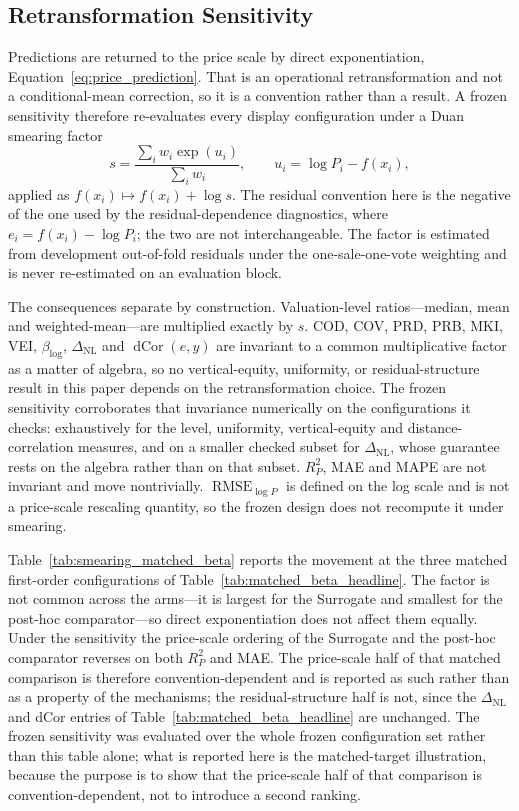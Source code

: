 \documentclass[10pt]{article}
\theoremstyle{definition}
\newcommand{\1}{\mathbf{1}}
\begin{document}
\subsection{Retransformation Sensitivity}
\label{app:smearing}

Predictions are returned to the price scale by direct exponentiation,
Equation~\eqref{eq:price_prediction}. That is an operational retransformation and not a
conditional-mean correction, so it is a convention rather than a result. A frozen sensitivity
therefore re-evaluates every display configuration under a Duan smearing factor
\[
s=\frac{\sum_i w_i\exp(u_i)}{\sum_i w_i},
\qquad u_i=\log P_i-f(x_i),
\]
applied as $f(x_i)\mapsto f(x_i)+\log s$. The residual convention here is the negative of the one
used by the residual-dependence diagnostics, where $e_i=f(x_i)-\log P_i$; the two are not
interchangeable. The factor is estimated from development out-of-fold residuals under the
one-sale-one-vote weighting and is never re-estimated on an evaluation block.

The consequences separate by construction. Valuation-level ratios---median, mean and
weighted-mean---are multiplied exactly by $s$. COD, COV, PRD, PRB, MKI, VEI, $\beta_{\log}$,
$\Delta_{\mathrm{NL}}$ and $\operatorname{dCor}(e,y)$ are invariant to a common multiplicative
factor as a matter of algebra, so no vertical-equity, uniformity, or residual-structure result in
this paper depends on the retransformation choice. The frozen sensitivity corroborates that
invariance numerically on the configurations it checks: exhaustively for the level, uniformity,
vertical-equity and distance-correlation measures, and on a smaller checked subset for
$\Delta_{\mathrm{NL}}$, whose guarantee rests on the algebra rather than on that subset.
$R^2_P$, MAE and MAPE are not invariant and move nontrivially.
$\operatorname{RMSE}_{\log P}$ is defined on the log scale and is not a price-scale rescaling
quantity, so the frozen design does not recompute it under smearing.

Table~\ref{tab:smearing_matched_beta} reports the movement at the three matched
first-order configurations of Table~\ref{tab:matched_beta_headline}. The factor is not common
across the arms---it is largest for the Surrogate and smallest for the post-hoc comparator---so
direct exponentiation does not affect them equally. Under the sensitivity the price-scale
ordering of the Surrogate and the post-hoc comparator reverses on both $R^2_P$ and MAE. The
price-scale half of that matched comparison is therefore convention-dependent and is reported as
such rather than as a property of the mechanisms; the residual-structure half is not, since the
$\Delta_{\mathrm{NL}}$ and dCor entries of Table~\ref{tab:matched_beta_headline} are unchanged. The
frozen sensitivity was evaluated over the whole frozen configuration set rather than this table
alone; what is reported here is the matched-target illustration, because the purpose is to show that
the price-scale half of that comparison is convention-dependent, not to introduce a second ranking.
\end{document}
